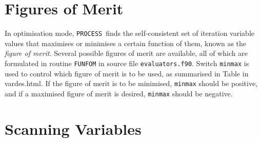 \documentclass[11pt,a4paper]{report}
\newcommand{\process}{\mbox{\texttt{PROCESS}}}
\renewcommand{\vec}[1]{\boldsymbol{#1}}
\begin{document}
\label{sec:slack}








\section{Figures of Merit}
\label{sec:foms}

In optimisation mode, \process\ finds the self-consistent set of iteration
variable values that maximises or minimises a certain function of them, known
as the \textit{figure of merit}. Several possible figures of merit are
available, all of which are formulated in routine \texttt{FUNFOM} in source
file \texttt{evaluators.f90}.  Switch \texttt{minmax} is used to control which
figure of merit is to be used, as summarised in Table in vardes.html. If the
figure of merit is to be minimised, \texttt{minmax} should be positive, and if
a maximised figure of merit is desired, \texttt{minmax} should be negative.


\section{Scanning Variables}
\label{sec:scans}
\end{document}
